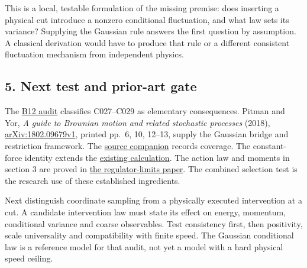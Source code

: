 \documentclass[11pt,a4paper]{article}
\begin{document}
This is a local, testable formulation of the missing premise: does
inserting a physical cut introduce a nonzero conditional fluctuation,
and what law sets its variance? Supplying the Gaussian rule answers the
first question by assumption. A classical derivation would have to
produce that rule or a different consistent fluctuation mechanism from
independent physics.

\hypertarget{next-test-and-prior-art-gate}{%
\subsection{5. Next test and prior-art
gate}\label{next-test-and-prior-art-gate}}

The \href{../references/batches/B12.md}{B12 audit} classifies C027--C029
as elementary consequences. Pitman and Yor, \emph{A guide to Brownian
motion and related stochastic processes} (2018),
\href{https://arxiv.org/abs/1802.09679v1}{arXiv:1802.09679v1}, printed
pp.~6, 10, 12--13, supply the Gaussian bridge and restriction framework.
The \href{../docs/batches/B12/PitmanYor2018.md}{source companion}
records coverage. The constant-force identity extends the
\href{../notes/principia-constant-force-action.md}{existing
calculation}. The action law and moments in section 3 are proved in
\href{../papers/regulator-limits.tex}{the regulator-limits paper}. The
combined selection test is the research use of these established
ingredients.

Next distinguish coordinate sampling from a physically executed
intervention at a cut. A candidate intervention law must state its
effect on energy, momentum, conditional variance and coarse observables.
Test consistency first, then positivity, scale universality and
compatibility with finite speed. The Gaussian conditional law is a
reference model for that audit, not yet a model with a hard physical
speed ceiling.
\end{document}
